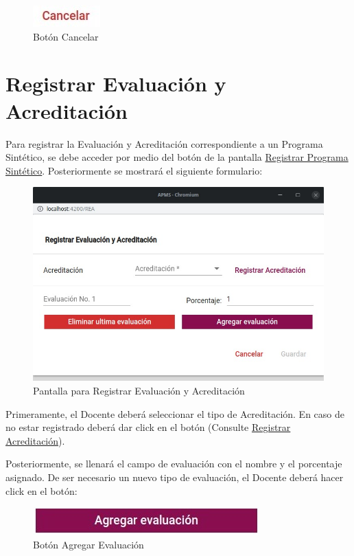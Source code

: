 \documentclass[10pt]{book}
\begin{document}
\begin{figure}[!hbtp]
    \centering
    \includegraphics[width=0.1\linewidth]{images/SP6/BotonCancelar.jpeg}
    \caption{Botón Cancelar} 
\end{figure}
\pagebreak
\hypertarget{REyA}{\section{Registrar Evaluación y Acreditación}}


Para registrar la Evaluación y Acreditación correspondiente a un Programa Sintético, se debe acceder por medio del botón  de la pantalla \hyperlink{RegistrarPS}{Registrar Programa Sintético}. Posteriormente se mostrará el siguiente formulario: 


\begin{figure}[!h]
    \centering
    \hypertarget{RegistrarEC}{\includegraphics[width=0.5\linewidth]{images/SP6/8.jpeg}}
    \caption{Pantalla para Registrar Evaluación y Acreditación}
\end{figure}

Primeramente, el Docente deberá seleccionar el tipo de Acreditación. En caso de no estar registrado deberá dar click en el botón (Consulte \hyperlink{RegAcre}{Registrar Acreditación}).

Posteriormente, se llenará el campo de evaluación con el nombre y el porcentaje asignado. De ser necesario un nuevo tipo de evaluación, el Docente deberá hacer click en el botón:

\begin{figure}[!h]
    \centering
    \includegraphics[width=0.3\linewidth]{images/SP6/BotonEval.jpeg}
    \caption{Botón Agregar Evaluación} 
\end{figure}
\end{document}
